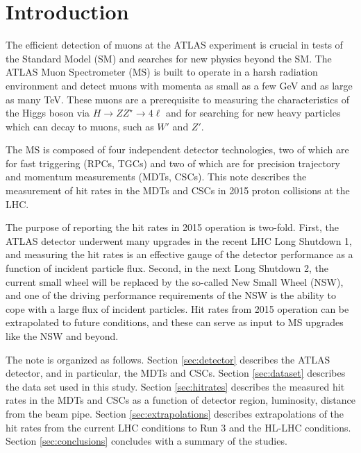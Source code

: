 \section{Introduction}
\label{sec:intro}

The efficient detection of muons at the ATLAS experiment is crucial in tests of the Standard Model (SM) and searches for new physics beyond the SM. The ATLAS Muon Spectrometer (MS) is built to operate in a harsh radiation environment and detect muons with momenta as small as a few GeV and as large as many TeV. These muons are a prerequisite to measuring the characteristics of the Higgs boson via $H\rightarrow ZZ^\star\rightarrow 4\ell$ and for searching for new heavy particles which can decay to muons, such as $W'$ and $Z'$. 

The MS is composed of four independent detector technologies, two of which are for fast triggering (RPCs, TGCs) and two of which are for precision trajectory and momentum measurements (MDTs, CSCs). This note describes the measurement of hit rates in the MDTs and CSCs in 2015 proton collisions at the LHC. 


The purpose of reporting the hit rates in 2015 operation is two-fold. First, the ATLAS detector underwent many upgrades in the recent LHC Long Shutdown 1, and measuring the hit rates is an effective gauge of the detector performance as a function of incident particle flux. Second, in the next Long Shutdown 2, the current small wheel will be replaced by the so-called New Small Wheel (NSW), and one of the driving performance requirements of the NSW is the ability to cope with a large flux of incident particles. Hit rates from 2015 operation can be extrapolated to future conditions, and these can serve as input to MS upgrades like the NSW and beyond.

The note is organized as follows. Section \ref{sec:detector} describes the ATLAS detector, and in particular, the MDTs and CSCs. Section \ref{sec:dataset} describes the data set used in this study. Section \ref{sec:hitrates} describes the measured hit rates in the MDTs and CSCs as a function of detector region, luminosity, distance from the beam pipe. Section \ref{sec:extrapolations} describes extrapolations of the hit rates from the current LHC conditions to Run 3 and the HL-LHC conditions. Section \ref{sec:conclusions} concludes with a summary of the studies.


